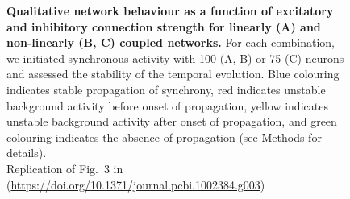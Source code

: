 \documentclass[10pt,a4paper,onecolumn]{article}
\begin{document}
\begin{figure}
\begin{subfigure}[t]{0.33\textwidth}
\end{subfigure}
\caption{\label{fig:grid}
\textbf{Qualitative network behaviour as a function of excitatory and inhibitory connection strength for linearly (A) and non-linearly (B, C) coupled networks.} For each combination, we initiated synchronous activity with 100 (A, B) or 75 (C) neurons and assessed the stability of the temporal evolution. Blue colouring indicates stable propagation of synchrony, red indicates unstable background activity before onset of propagation, yellow indicates unstable background activity after onset of propagation, and green colouring indicates the absence of propagation (see Methods for details).\\
Replication of Fig.~3 in \cite{Memmesheimer2012} (\url{https://doi.org/10.1371/journal.pcbi.1002384.g003})}
\end{figure}
\end{document}
